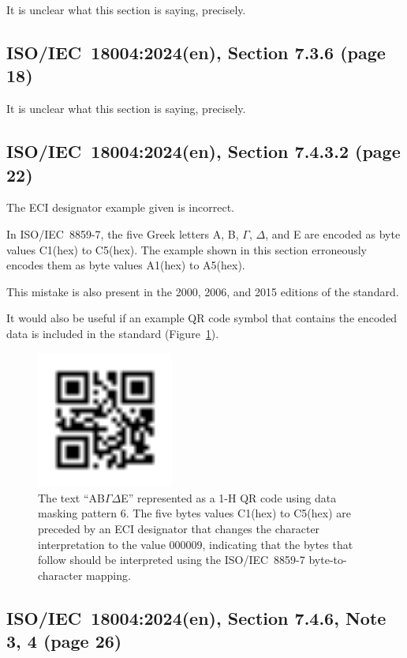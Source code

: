 \documentclass[a4paper,twoside]{article}
\newcommand{\shortstandard}{ISO/IEC~18004}
\newcommand{\standard}{\shortstandard:2024(en)}
\newcommand{\hex}[1]{#1(hex)}
\begin{document}
It is unclear what this section is saying, precisely.

\subsection{\standard, Section 7.3.6 (page 18)}

It is unclear what this section is saying, precisely.

\subsection{\standard, Section 7.4.3.2 (page 22)}

The ECI designator example given is incorrect.

In ISO/IEC~8859-7, the five Greek letters A, B, $\Gamma$, $\Delta$, and E are encoded as byte values \hex{C1} to \hex{C5}.
The example shown in this section erroneously encodes them as byte values \hex{A1} to \hex{A5}.

This mistake is also present in the 2000, 2006, and 2015 editions of the standard.

It would also be useful if an example QR code symbol that contains the encoded data is included in the standard (Figure~\ref{fig:greek-encoding}).

\begin{figure}[h]
\centering
\includegraphics[width=0.4\textwidth]{images/qrcode_iso18004_2024_QRCodeSymbol_1Mp6.png}
\caption{The text ``AB$\mathit{\Gamma\Delta}$E'' represented as a 1-H QR code using data masking pattern 6.
         The five bytes values \hex{C1} to \hex{C5} are preceded by an ECI designator that changes the character
         interpretation to the value 000009, indicating that the bytes that follow should be interpreted using
         the ISO/IEC~8859-7 byte-to-character mapping.}
\label{fig:greek-encoding}
\end{figure}

\subsection{\standard, Section 7.4.6, Note 3, 4 (page 26)}
\end{document}
